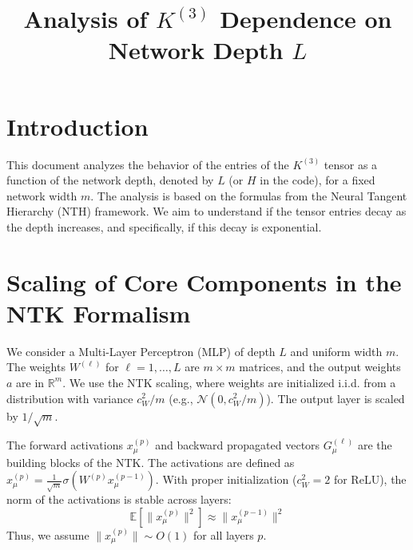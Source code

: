 \documentclass[11pt,a4paper]{article}
\title{\textbf{Analysis of $K^{(3)}$ Dependence on Network Depth $L$}}
\author{}
\date{}
\begin{document}
\maketitle

\section{Introduction}

This document analyzes the behavior of the entries of the $K^{(3)}$ tensor as a function of the network depth, denoted by $L$ (or $H$ in the code), for a fixed network width $m$. The analysis is based on the formulas from the Neural Tangent Hierarchy (NTH) framework. We aim to understand if the tensor entries decay as the depth increases, and specifically, if this decay is exponential.

\section{Scaling of Core Components in the NTK Formalism}

We consider a Multi-Layer Perceptron (MLP) of depth $L$ and uniform width $m$. The weights $W^{(\ell)}$ for $\ell=1, \dots, L$ are $m \times m$ matrices, and the output weights $a$ are in $\mathbb{R}^m$. We use the NTK scaling, where weights are initialized i.i.d. from a distribution with variance $c_W^2/m$ (e.g., $\mathcal{N}(0, c_W^2/m)$). The output layer is scaled by $1/\sqrt{m}$.

The forward activations $x^{(p)}_\mu$ and backward propagated vectors $G^{(\ell)}_\mu$ are the building blocks of the NTK.
The activations are defined as $x^{(p)}_\mu = \frac{1}{\sqrt{m}}\sigma(W^{(p)} x^{(p-1)}_\mu)$. With proper initialization ($c_W^2=2$ for ReLU), the norm of the activations is stable across layers:
\begin{equation}
    \mathbb{E}[\|x^{(p)}_\mu\|^2] \approx \|x^{(p-1)}_\mu\|^2
\end{equation}
Thus, we assume $\|x^{(p)}_\mu\| \sim O(1)$ for all layers $p$.
\end{document}
